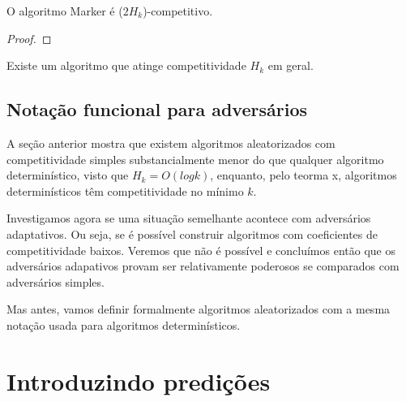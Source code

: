 \documentclass[a4paper,oneside,reqno,12pt]{amsart}
\begin{document}
\begin{theorem}

  O algoritmo Marker é (\(2H_k\))-competitivo.
  
  \begin{proof}
    
  \end{proof}
  
\end{theorem}


Existe um algoritmo que atinge competitividade \(H_k\) em geral.

\subsection{Notação funcional para adversários}

A seção anterior mostra que existem algoritmos aleatorizados com competitividade simples substancialmente menor do que qualquer algoritmo determinístico, visto que \(H_k = O(log k)\), enquanto, pelo teorma x, algoritmos determinísticos têm competitividade no mínimo \(k\).

Investigamos agora se uma situação semelhante acontece com adversários adaptativos. Ou seja, se é possível construir algoritmos com coeficientes de competitividade baixos. Veremos que não é possível e concluímos então que os adversários adapativos provam ser relativamente poderosos se comparados com adversários simples.

Mas antes, vamos definir formalmente algoritmos aleatorizados com a mesma notação usada para algoritmos determinísticos.

\section{Introduzindo predições}

\begingroup
{}
\printbibliography
\endgroup

\normalsize





\end{document}
